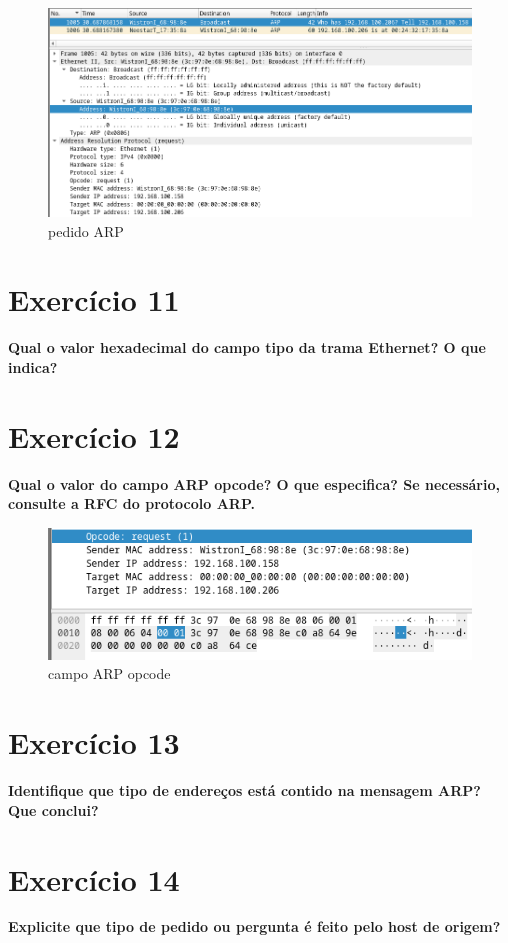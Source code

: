 \documentclass[a4paper]{report}
\begin{document}
\begin{figure}[H]
    \centering 
    \includegraphics[width=\textwidth]{images/ex10.png}
    \caption{pedido ARP}
    \label{fig:ex10}
\end{figure}

\section{Exercício 11}
\textbf{Qual o valor hexadecimal do campo tipo da trama Ethernet? O que indica?}


\section{Exercício 12}
\textbf{Qual o valor do campo ARP opcode? O que especifica?  Se necessário,
consulte a RFC do protocolo ARP.}

\begin{figure}[H]
    \centering 
    \includegraphics[width=\textwidth]{images/ex12.png}
    \caption{campo ARP opcode}
    \label{fig:ex12}
\end{figure}

\section{Exercício 13}
\textbf{Identifique que tipo de endereços está contido na mensagem ARP? Que
conclui?}


\section{Exercício 14}
\textbf{Explicite que tipo de pedido ou pergunta é feito pelo host de origem?}
\end{document}
